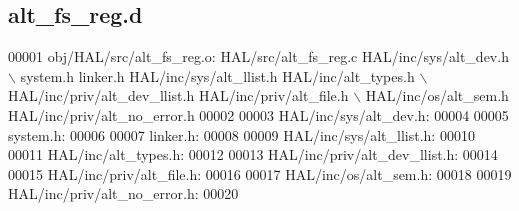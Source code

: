 \subsection{alt\+\_\+fs\+\_\+reg.\+d}
\label{alt__fs__reg_8d_source}

\begin{DoxyCode}
00001 obj/HAL/src/alt_fs_reg.o: HAL/src/alt_fs_reg.c HAL/inc/sys/alt_dev.h \(\backslash\)
 system.h linker.h HAL/inc/sys/alt_llist.h HAL/inc/alt\_types.h \(\backslash\)
 HAL/inc/priv/alt_dev_llist.h HAL/inc/priv/alt\_file.h \(\backslash\)
 HAL/inc/os/alt\_sem.h HAL/inc/priv/alt_no_error.h
00002 
00003 HAL/inc/sys/alt_dev.h:
00004 
00005 system.h:
00006 
00007 linker.h:
00008 
00009 HAL/inc/sys/alt_llist.h:
00010 
00011 HAL/inc/alt\_types.h:
00012 
00013 HAL/inc/priv/alt_dev_llist.h:
00014 
00015 HAL/inc/priv/alt\_file.h:
00016 
00017 HAL/inc/os/alt\_sem.h:
00018 
00019 HAL/inc/priv/alt_no_error.h:
00020 \end{DoxyCode}
